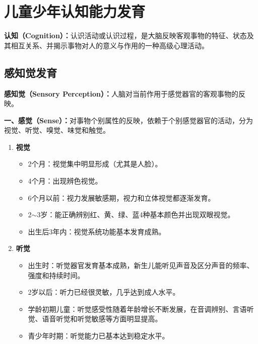 \section{儿童少年认知能力发育}

\begin{keybox}
\textbf{认知（Cognition）：}认识活动或认识过程，是大脑反映客观事物的特征、状态及其相互关系、并揭示事物对人的意义与作用的一种高级心理活动。
\end{keybox}

\subsection{感知觉发育}

\begin{keybox}
\textbf{感知觉（Sensory Perception）：}人脑对当前作用于感觉器官的客观事物的反映。

\textbf{一、感觉（Sense）：}对事物个别属性的反映，依赖于个别感觉器官的活动，分为视觉、听觉、嗅觉、味觉和触觉。

\begin{enumerate}[leftmargin=*]
    \item \textbf{视觉}
    \begin{itemize}[leftmargin=*]
        \item 2个月：视觉集中明显形成（尤其是人脸）。
        \item 4个月：出现辨色视觉。
        \item 6个月以前：视力发展敏感期，视力和立体视觉都逐渐发育。
        \item 2$\sim$3岁：能正确辨别红、黄、绿、蓝4种基本颜色并出现双眼视觉。
        \item 出生后3年内：视觉系统功能基本发育成熟。
    \end{itemize}

    \item \textbf{听觉}
    \begin{itemize}[leftmargin=*]
        \item 出生时：听觉器官发育基本成熟，新生儿能听见声音及区分声音的频率、强度和持续时间。
        \item 2岁以后：听力已经很灵敏，几乎达到成人水平。
        \item 学龄初期儿童：听觉感受性随着年龄增长不断发展，在音调辨别、言语听觉、语音听觉和听觉敏感等方面明显提高。
        \item 青少年时期：听觉能力已基本达到稳定水平。
    \end{itemize}


\end{enumerate}
\end{keybox}
